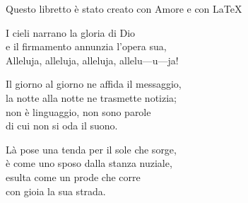 \documentclass[11pt]{book}
\begin{document}
\restoregeometry
\newpage\null\thispagestyle{empty}\newpage
\afterpage{\cfoot{\thepage}}
\null\vfill
\begin{center}
{\footnotesize Questo libretto è stato creato con Amore e con \LaTeX}
\end{center}
\newpage\null\thispagestyle{empty}\newpage
\settowidth{\versewidth}{Il giorno al giorno ne affida il messaggio,}
\begin{canzone}%
\begin{ritornello}
I cieli narrano la gloria di Dio\\
e il firmamento annunzia l’opera sua,\\
Alleluja, alleluja, alleluja, allelu—u—ja!
\end{ritornello}

Il giorno al giorno ne affida il messaggio,\\
la notte alla notte ne trasmette notizia;\\
non è linguaggio, non sono parole\\
di cui non si oda il suono.

Là pose una tenda per il sole che sorge,\\
è come uno sposo dalla stanza nuziale,\\
esulta come un prode che corre\\
con gioia la sua strada.
\end{canzone}
{}
\introduzione

\membatt
\end{document}
